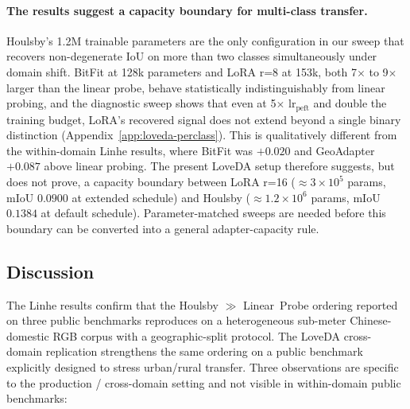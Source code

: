 \documentclass[11pt]{article}
\begin{document}
\paragraph{The results suggest a capacity boundary for multi-class transfer.} Houlsby's 1.2M trainable parameters are the only configuration in our sweep that recovers non-degenerate IoU on more than two classes simultaneously under domain shift. BitFit at 128k parameters and LoRA r=8 at 153k, both 7$\times$ to 9$\times$ larger than the linear probe, behave statistically indistinguishably from linear probing, and the diagnostic sweep shows that even at 5$\times$ lr$_{\mathrm{peft}}$ and double the training budget, LoRA's recovered signal does not extend beyond a single binary distinction (Appendix~\ref{app:loveda-perclass}). This is qualitatively different from the within-domain Linhe results, where BitFit was $+0.020$ and GeoAdapter $+0.087$ above linear probing. The present LoveDA setup therefore suggests, but does not prove, a capacity boundary between LoRA r=16 ($\approx$$3 \times 10^5$ params, mIoU $0.0900$ at extended schedule) and Houlsby ($\approx$$1.2 \times 10^6$ params, mIoU $0.1384$ at default schedule). Parameter-matched sweeps are needed before this boundary can be converted into a general adapter-capacity rule.

\subsection{Discussion}

The Linhe results confirm that the Houlsby $\gg$ Linear~Probe ordering reported on three public benchmarks reproduces on a heterogeneous sub-meter Chinese-domestic RGB corpus with a geographic-split protocol. The LoveDA cross-domain replication strengthens the same ordering on a public benchmark explicitly designed to stress urban/rural transfer. Three observations are specific to the production / cross-domain setting and not visible in within-domain public benchmarks:
\end{document}

